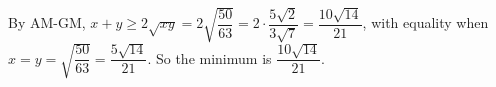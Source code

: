 By AM-GM, $x+y\ge2\sqrt{xy}=2\sqrt{\dfrac{50}{63}}=2\cdot\dfrac{5\sqrt2}{3\sqrt7}=\dfrac{10\sqrt{14}}{21}$, with equality when $x=y=\sqrt{\dfrac{50}{63}}=\dfrac{5\sqrt{14}}{21}$. So the minimum is $\boxed{\dfrac{10\sqrt{14}}{21}}$.

